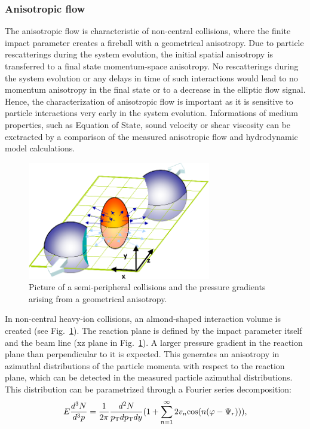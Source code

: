 \subsubsection{Anisotropic flow}
\label{sec:AnisotropicFlow}
The anisotropic flow is characteristic of non-central collisions, where the 
finite impact parameter creates a fireball with a geometrical anisotropy. 
Due to particle rescatterings during the system evolution, the initial spatial 
anisotropy is transferred to a final state momentum-space anisotropy. No
 rescatterings during the system evolution or any delays in time of such 
 interactions would lead to no momentum anisotropy in the final state or
  to a decrease in the elliptic flow signal. Hence, the characterization of 
  anisotropic flow is important as it is sensitive to particle interactions very 
  early in the system evolution. Informations of medium properties, such as Equation of 
  State, sound velocity or shear viscosity can be exctracted by a comparison 
  of the measured anisotropic flow and hydrodynamic model calculations.
\begin{figure}[!ht]
  \centering
  \includegraphics[width=8cm]{FigCap1/elliptic_flow_3D_medium.png}
  \caption{Picture of a semi-peripheral collisions and the pressure gradients arising from a geometrical anisotropy.}
  \label{fig:elliptic_flow_3D_medium}
\end{figure}
In non-central heavy-ion collisions, an almond-shaped interaction 
volume is created (see Fig.~\ref{fig:elliptic_flow_3D_medium}).
The reaction plane is defined by the impact parameter itself and the 
beam line (xz plane in Fig.~\ref{fig:elliptic_flow_3D_medium}). 
A larger pressure gradient in the
 reaction plane than perpendicular to it is expected. This generates an
  anisotropy in azimuthal distributions of the particle momenta with 
  respect to the reaction plane, which can be detected in the measured
   particle azimuthal distributions. This distribution can be parametrized 
   through a Fourier series decomposition:
\begin{equation}
\label{eq:FourierAzimuthExpansion}
E \frac{d^3N}{d^3p} = \frac{1}{2\pi} \frac{d^2N}{p_{\rm T} dp_{\rm T} dy} (1 + \sum_{n=1}^\infty 2v_n {\rm cos} (n(\varphi - \Psi_r))),
\end{equation}
